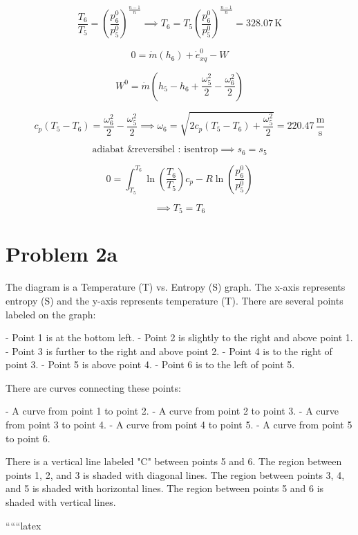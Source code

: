 \[
\frac{T_6}{T_5} = \left( \frac{p_6^0}{p_5^0} \right)^{\frac{n-1}{n}} \implies T_6 = T_5 \left( \frac{p_6^0}{p_5^0} \right)^{\frac{n-1}{n}} = 328.07 \, \text{K}
\]

\[
0 = \dot{m}(h_6) + \dot{e}_{xq}^0 - W
\]

\[
W^0 = \dot{m} \left( h_5 - h_6 + \frac{\omega_5^2}{2} - \frac{\omega_6^2}{2} \right)
\]

\[
c_p (T_5 - T_6) = \frac{\omega_6^2}{2} - \frac{\omega_5^2}{2} \implies \omega_6 = \sqrt{2 c_p (T_5 - T_6) + \frac{\omega_5^2}{2}} = 220.47 \, \frac{\text{m}}{\text{s}}
\]

\[
\text{adiabat \& reversibel : isentrop} \implies s_6 = s_5
\]

\[
0 = \int_{T_5}^{T_6} \ln \left( \frac{T_6}{T_5} \right) c_p - R \ln \left( \frac{p_6^0}{p_5^0} \right)
\]

\[
\implies T_5 = T_6
\]

\section*{Problem 2a}

The diagram is a Temperature (T) vs. Entropy (S) graph. The x-axis represents entropy (S) and the y-axis represents temperature (T). There are several points labeled on the graph:

- Point 1 is at the bottom left.
- Point 2 is slightly to the right and above point 1.
- Point 3 is further to the right and above point 2.
- Point 4 is to the right of point 3.
- Point 5 is above point 4.
- Point 6 is to the left of point 5.

There are curves connecting these points:

- A curve from point 1 to point 2.
- A curve from point 2 to point 3.
- A curve from point 3 to point 4.
- A curve from point 4 to point 5.
- A curve from point 5 to point 6.

There is a vertical line labeled "C" between points 5 and 6. The region between points 1, 2, and 3 is shaded with diagonal lines. The region between points 3, 4, and 5 is shaded with horizontal lines. The region between points 5 and 6 is shaded with vertical lines.

``````latex


